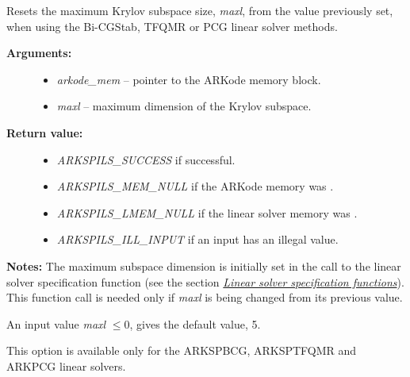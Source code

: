 \documentclass[letterpaper,10pt,english]{sphinxmanual}
\begin{document}
\begin{fulllineitems}
\label{c_interface/User_callable:ARKSpilsSetMaxl}
Resets the maximum Krylov subspace size, \emph{maxl}, from the value
previously set, when using the Bi-CGStab, TFQMR or PCG linear
solver methods.
\begin{description}
\item[{\textbf{Arguments:}}] \leavevmode\begin{itemize}
\item {} 
\emph{arkode\_mem} -- pointer to the ARKode memory block.

\item {} 
\emph{maxl} -- maximum dimension of the Krylov subspace.

\end{itemize}

\item[{\textbf{Return value:}}] \leavevmode\begin{itemize}
\item {} 
\emph{ARKSPILS\_SUCCESS} if successful.

\item {} 
\emph{ARKSPILS\_MEM\_NULL} if the ARKode memory was .

\item {} 
\emph{ARKSPILS\_LMEM\_NULL} if the linear solver memory was .

\item {} 
\emph{ARKSPILS\_ILL\_INPUT} if an input has an illegal value.

\end{itemize}

\end{description}

\textbf{Notes:} The maximum subspace dimension is initially set in the
call to the linear solver specification function (see the section
{\hyperref[c_interface/User_callable:cinterface-linearsolvers]{\emph{Linear solver specification functions}}}).  This function call is needed
only if \emph{maxl} is being changed from its previous value.

An input value \emph{maxl} $\le 0$, gives the default value, 5.

This option is available only for the ARKSPBCG, ARKSPTFQMR and
ARKPCG linear solvers.

\end{fulllineitems}
\end{document}
